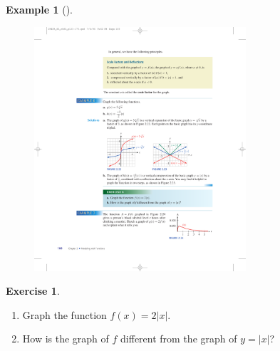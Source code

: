 \documentclass[10pt,]{book}
\theoremstyle{plain}
\theoremstyle{definition}
\theoremstyle{definition}
\theoremstyle{definition}
\newtheorem{example}[theorem]{Example}
\theoremstyle{definition}
\theoremstyle{definition}
\newtheorem{exercise}[theorem]{Exercise}
\numberwithin{equation}{section}
\newcommand\abs[1]{\left|#1\right|}
\begin{document}
\begin{example}[]
\begin{enumerate}[label=*\alph**]
\begin{figure}
\centering
\includegraphics[width=0.70\textwidth,]{images/fig-scale-abs.pdf}\caption{\label{fig-scale-abs}}
\end{figure}
\end{enumerate}
\end{example}
\begin{exercise}\label{scale-abs}
\leavevmode%
\begin{enumerate}[label=*\alph**]
\item\hypertarget{li-315}{}Graph the function \(f (x) = 2\abs{x}\).\item\hypertarget{li-316}{}How is the graph of \(f\) different from the graph of \(y =\abs{x}\)?\end{enumerate}
\end{exercise}
\end{document}
